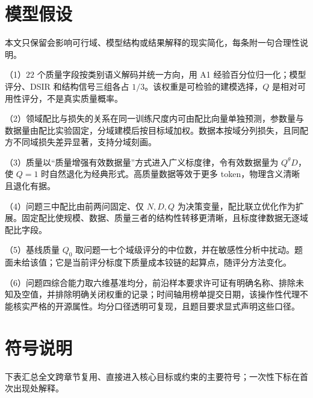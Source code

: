\documentclass[zihao=-4,a4paper]{ctexart}
\newcommand{\Dt}{D}
\begin{document}


\section{模型假设}
本文只保留会影响可行域、模型结构或结果解释的现实简化，每条附一句合理性说明。

（1）$22$ 个质量字段按类别语义解码并统一方向，用 A1 经验百分位归一化；模型评分、DSIR 和结构信号三组各占 $1/3$。该权重是可检验的建模选择，$Q$ 是相对可用性评分，不是真实质量概率。

（2）领域配比与损失的关系在同一训练尺度内可由配比向量单独预测，参数量与数据量由配比实验固定，分域建模后按目标域加权。数据本按域分列损失，且同配方不同域损失差异显著，支持分域刻画。

（3）质量以“质量增强有效数据量”方式进入广义标度律，令有效数据量为 $Q^{\theta}\Dt$，使 $Q=1$ 时自然退化为经典形式。高质量数据等效于更多 token，物理含义清晰且退化有据。

（4）问题三中配比由前两问固定、仅 $N,\Dt,Q$ 为决策变量，配比联立优化作为扩展。固定配比使规模、数据、质量三者的结构性转移更清晰，且标度律数据无逐域配比字段。

（5）基线质量 $Q_0$ 取问题一七个域级评分的中位数，并在敏感性分析中扰动。题面未给该值；它是当前评分标度下质量成本铰链的起算点，随评分方法变化。

（6）问题四综合能力取六维基准均分，前沿样本要求许可证有明确名称、排除未知及空值，并排除明确关闭权重的记录；时间轴用榜单提交日期，该操作性代理不能核实严格的开源属性。均分口径透明可复现，且题目要求显式声明这些口径。

\section{符号说明}
下表汇总全文跨章节复用、直接进入核心目标或约束的主要符号；一次性下标在首次出现处解释。
\end{document}

